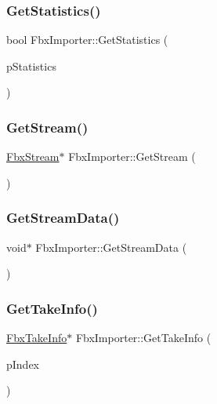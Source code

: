 \subsubsection{\texorpdfstring{Get\+Statistics()}{GetStatistics()}}
{\footnotesize\ttfamily bool Fbx\+Importer\+::\+Get\+Statistics (\begin{DoxyParamCaption}\item[{\hyperlink{class_fbx_statistics}{Fbx\+Statistics} $\ast$}]{p\+Statistics }\end{DoxyParamCaption})}

\mbox{\label{class_fbx_importer_a7df99385df3407f5c17a9badf748fcab}} 
\subsubsection{\texorpdfstring{Get\+Stream()}{GetStream()}}
{\footnotesize\ttfamily \hyperlink{class_fbx_stream}{Fbx\+Stream}$\ast$ Fbx\+Importer\+::\+Get\+Stream (\begin{DoxyParamCaption}{ }\end{DoxyParamCaption})}

\mbox{\label{class_fbx_importer_ab6b8c23dbcfa775b97467e430ff204ec}} 
\subsubsection{\texorpdfstring{Get\+Stream\+Data()}{GetStreamData()}}
{\footnotesize\ttfamily void$\ast$ Fbx\+Importer\+::\+Get\+Stream\+Data (\begin{DoxyParamCaption}{ }\end{DoxyParamCaption})}

\mbox{\label{class_fbx_importer_a6733de02d09423cfc5cdabd808954e62}} 
\subsubsection{\texorpdfstring{Get\+Take\+Info()}{GetTakeInfo()}}
{\footnotesize\ttfamily \hyperlink{class_fbx_take_info}{Fbx\+Take\+Info}$\ast$ Fbx\+Importer\+::\+Get\+Take\+Info (\begin{DoxyParamCaption}\item[{int}]{p\+Index }\end{DoxyParamCaption})}

